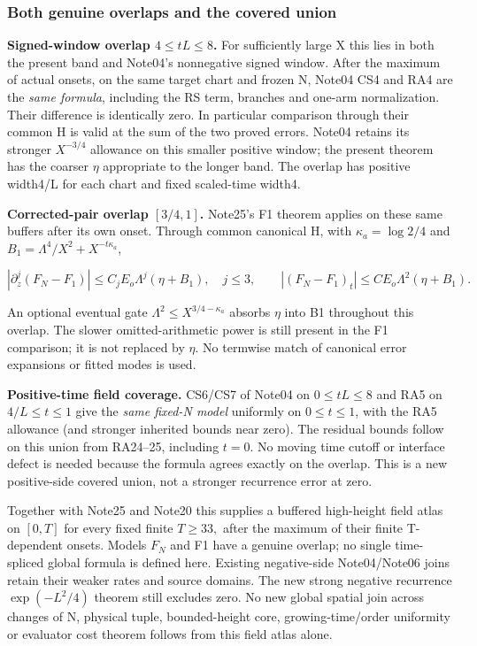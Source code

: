 \subsubsection{Both genuine overlaps and the covered union}
\label{subsec:ra-8}

\textbf{Signed-window overlap \(4\le tL\le 8\).} For sufficiently large X this lies in both the present band and Note04's nonnegative signed window. After the maximum of actual onsets, on the same target chart and frozen N, Note04 CS4 and RA4 are the \emph{same formula}, including the RS term, branches and one-arm normalization. Their difference is identically zero. In particular comparison through their common H is valid at the sum of the two proved errors. Note04 retains its stronger \(X^{-3/4}\) allowance on this smaller positive window; the present theorem has the coarser \(\eta\) appropriate to the longer band. The overlap has positive width4/L for each chart and fixed scaled-time width4.

\textbf{Corrected-pair overlap \([3/4,1]\).} Note25's F1 theorem applies on these same buffers after its own onset. Through common canonical H, with \(\kappa_{a}=\log2/4\) and \(B_{1}=\Lambda^{4}/X^{2}+X^{-t \kappa_{a}}\),

\[
|\partial_z^j(F_N-F_1)|\le C_jE_o\Lambda^j(\eta+B_1),
\quad j\le3,\qquad
|(F_N-F_1)_t|\le C E_o\Lambda^2(\eta+B_1).
\tag{RA27}\label{eq:ansatz-ra27}
\]

An optional eventual gate \(\Lambda^{2}\le X^{3/4-\kappa_{a}}\) absorbs \(\eta\) into B1 throughout this overlap. The slower omitted-arithmetic power is still present in the F1 comparison; it is not replaced by \(\eta.\) No termwise match of canonical error expansions or fitted modes is used.

\textbf{Positive-time field coverage.} CS6/CS7 of Note04 on \(0\le tL\le 8\) and RA5 on \(4/L\le t\le 1\) give the \emph{same fixed-N model} uniformly on \(0\le t\le 1\), with the RA5 allowance (and stronger inherited bounds near zero). The residual bounds follow on this union from RA24--25, including \(t=0.\) No moving time cutoff or interface defect is needed because the formula agrees exactly on the overlap. This is a new positive-side covered union, not a stronger recurrence error at zero.

Together with Note25 and Note20 this supplies a buffered high-height field atlas on \([0,T]\) for every fixed finite \(T\ge 33,\) after the maximum of their finite T-dependent onsets. Models \(F_{N}\) and F1 have a genuine overlap; no single time-spliced global formula is defined here. Existing negative-side Note04/Note06 joins retain their weaker rates and source domains. The new strong negative recurrence \(\exp(-L^{2}/4)\) theorem still excludes zero. No new global spatial join across changes of N, physical tuple, bounded-height core, growing-time/order uniformity or evaluator cost theorem follows from this field atlas alone.


